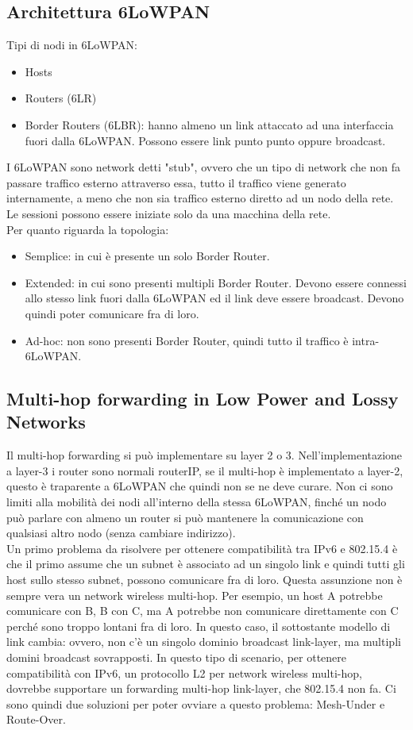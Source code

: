\documentclass{article}
\begin{document}
\subsection{Architettura 6LoWPAN}
Tipi di nodi in 6LoWPAN:
\begin{itemize}
    \item Hosts 
    \item Routers (6LR)
    \item Border Routers (6LBR): hanno almeno un link attaccato ad una interfaccia fuori dalla 6LoWPAN. Possono essere link punto punto oppure broadcast.
\end{itemize}
I 6LoWPAN sono network detti "stub", ovvero che un tipo di network che non fa passare traffico esterno attraverso essa, tutto il traffico viene generato internamente, a meno che non sia traffico esterno diretto ad un nodo della rete. Le sessioni possono essere iniziate solo da una macchina della rete. \\ Per quanto riguarda la topologia:
\begin{itemize}
    \item Semplice: in cui è presente un solo Border Router.
    \item Extended: in cui sono presenti multipli Border Router. Devono essere connessi allo stesso link fuori dalla 6LoWPAN ed il link deve essere broadcast. Devono quindi poter comunicare fra di loro.
    \item Ad-hoc: non sono presenti Border Router, quindi tutto il traffico è intra-6LoWPAN.
\end{itemize}

\subsection{Multi-hop forwarding in Low Power and Lossy Networks}
Il multi-hop forwarding si può implementare su layer 2 o 3. Nell'implementazione a layer-3 i router sono normali routerIP, se il multi-hop è implementato a layer-2, questo è traparente a 6LoWPAN che quindi non se ne deve curare. Non ci sono limiti alla mobilità dei nodi all'interno della stessa 6LoWPAN, finché un nodo può parlare con almeno un router si può mantenere la comunicazione con qualsiasi altro nodo (senza cambiare indirizzo).\\ Un primo problema da risolvere per ottenere compatibilità tra IPv6 e 802.15.4 è che il primo assume che un subnet è associato ad un singolo link e quindi tutti gli host sullo stesso subnet, possono comunicare fra di loro. Questa assunzione non è sempre vera un network wireless multi-hop. Per esempio, un host A potrebbe comunicare con B, B con C, ma A potrebbe non comunicare direttamente con C perché sono troppo lontani fra di loro. In questo caso, il sottostante modello di link cambia: ovvero, non c'è un singolo dominio broadcast link-layer, ma multipli domini broadcast sovrapposti. In questo tipo di scenario, per ottenere compatibilità con IPv6, un protocollo L2 per network wireless multi-hop, dovrebbe supportare un forwarding multi-hop link-layer, che 802.15.4 non fa. Ci sono quindi due soluzioni per poter ovviare a questo problema: Mesh-Under e Route-Over.
\end{document}
